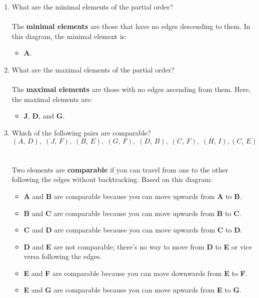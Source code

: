 \documentclass{amsart}
\theoremstyle{definition}
\theoremstyle{Exercise}
\theoremstyle{remark}
\theoremstyle{rule}
\numberwithin{equation}{section}
\begin{document}
	\begin{enumerate}[label=(\alph{*})]
		\item What are the minimal elements of the partial order? \\\\
			The \textbf{minimal elements} are those that have no edges descending to
			them. In this diagram, the minimal element is:
			\begin{itemize}
				\item \textbf{A}.
			\end{itemize}

		\item What are the maximal elements of the partial order? \\\\
			The \textbf{maximal elements} are those with no edges ascending from them.
			Here, the maximal elements are:
			\begin{itemize}
				\item \textbf{J}, \textbf{D}, and \textbf{G}.
			\end{itemize}

		\item Which of the following pairs are comparable?
			\[
				(A,\, D),\; (J,\, F),\; (B,\, E),\; (G,\, F),\; (D,\, B),\; (C,\, F),\; (
				H,\, I), (C,\, E)
			\]
			\\\\
			Two elements are \textbf{comparable} if you can travel from one to the
			other following the edges without backtracking. Based on this diagram:
			\begin{itemize}
				\item \textbf{A} and \textbf{B} are comparable because you can move upwards
					from \textbf{A} to \textbf{B}.

				\item \textbf{B} and \textbf{C} are comparable because you can move upwards
					from \textbf{B} to \textbf{C}.

				\item \textbf{C} and \textbf{D} are comparable because you can move upwards
					from \textbf{C} to \textbf{D}.

				\item \textbf{D} and \textbf{E} are not comparable; there's no way to
					move from \textbf{D} to \textbf{E} or vice versa following the edges.

				\item \textbf{E} and \textbf{F} are comparable because you can move downwards
					from \textbf{E} to \textbf{F}.

				\item \textbf{E} and \textbf{G} are comparable because you can move upwards
					from \textbf{E} to \textbf{G}.
			\end{itemize}
	\end{enumerate}
	\newpage
	~\\
\end{document}
